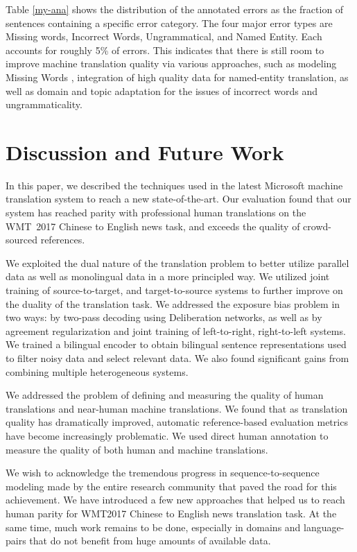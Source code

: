 \documentclass[a4paper]{article}
\begin{document}
\begin{CJK*}{UTF8}{gbsn}
Table \ref{my-ana} shows the distribution of the annotated errors as the fraction of sentences containing a specific error category. The four major error types are Missing words, Incorrect Words, Ungrammatical, and Named Entity. Each accounts for roughly 5\% of errors. This indicates that there is still room to improve machine translation quality via various approaches, such as modeling Missing Words \cite{tu2016modeling,AttentionFertility}, integration of high quality data for named-entity translation, as well as domain and topic adaptation for the issues of incorrect words and ungrammaticality.
 
\section{Discussion and Future Work}

In this paper, we described the techniques used in the latest Microsoft machine translation system to reach a new state-of-the-art. Our evaluation found that our system has reached parity with professional human translations on the WMT~2017 Chinese to English news task, and exceeds the quality of crowd-sourced references. 

We exploited the dual nature of the translation problem to better utilize parallel data as well as monolingual data in a more principled way. We utilized  joint training of source-to-target, and target-to-source systems to further improve on the duality of the translation task. We addressed the exposure bias problem in two ways: by two-pass decoding using Deliberation networks, as well as by agreement regularization and joint training of left-to-right, right-to-left systems. We trained a bilingual encoder to obtain bilingual sentence representations used to filter noisy data and select relevant data. We also found significant gains from combining multiple heterogeneous systems. 

We addressed the problem of defining and measuring the quality of human translations and near-human machine translations. We found that as translation quality has dramatically improved, automatic reference-based evaluation metrics have become increasingly problematic. We used direct human annotation to measure the quality of both human and machine translations.

We wish to acknowledge the tremendous progress in sequence-to-sequence modeling made by the entire research community that paved the road for this achievement. We have introduced a few new approaches that helped us to reach human parity for WMT2017 Chinese to English news translation task. At the same time, much work remains to be done, especially in domains and language-pairs that do not benefit from huge amounts of available data. 


\vfill




\end{CJK*}
\end{document}
